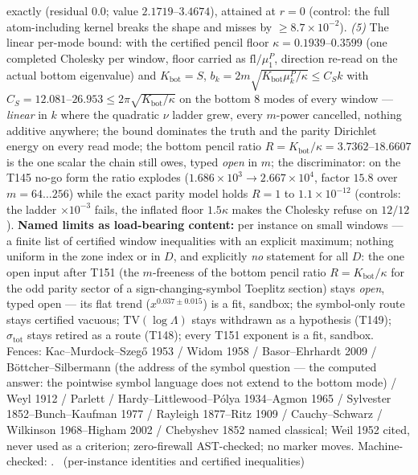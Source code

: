 exactly (residual $0.0$; value $2.1719$--$3.4674$), attained at $r=0$
(control: the full atom-including kernel breaks the shape and misses by
$\ge8.7\times10^{-2}$). \emph{(5)} The linear per-mode bound: with the
certified pencil floor $\kappa=0.1939$--$0.3599$ (one completed Cholesky
per window, floor carried as $\mathrm{fl}/\mu^P_1$, direction re-read on
the actual bottom eigenvalue) and $K_{\mathrm{bot}}=S$,
$b_k=2m\sqrt{K_{\mathrm{bot}}\mu^P_k/\kappa}\le C_Sk$ with
$C_S=12.081$--$26.953\le2\pi\sqrt{K_{\mathrm{bot}}/\kappa}$ on the bottom
$8$ modes of every window --- \emph{linear} in $k$ where the quadratic
$\nu$ ladder grew, every $m$-power cancelled, nothing additive anywhere;
the bound dominates the truth and the parity Dirichlet energy on every
read mode; the bottom pencil ratio
$R=K_{\mathrm{bot}}/\kappa=3.7362$--$18.6607$ is the one scalar the chain
still owes, typed \emph{open} in $m$; the discriminator: on the T145 no-go
form the ratio explodes ($1.686\times10^{3}\to2.667\times10^{4}$, factor
$15.8$ over $m=64\ldots256$) while the exact parity model holds $R=1$ to
$1.1\times10^{-12}$ (controls: the ladder $\times10^{-3}$ fails, the
inflated floor $1.5\kappa$ makes the Cholesky refuse on $12/12$).
\textbf{Named limits as load-bearing content:} per instance on small
windows --- a finite list of certified window inequalities with an explicit
maximum; nothing uniform in the zone index or in $D$, and explicitly
\emph{no} statement for all $D$: the one open input after T151 (the
$m$-freeness of the bottom pencil ratio $R=K_{\mathrm{bot}}/\kappa$ for
the odd parity sector of a sign-changing-symbol Toeplitz section) stays
\emph{open}, typed open --- its flat trend ($x^{0.037\pm0.015}$) is a fit,
sandbox; the symbol-only route stays certified vacuous;
$\mathrm{TV}(\log\Lambda)$ stays withdrawn as a hypothesis (T149);
$\sigma_{\mathrm{tot}}$ stays retired as a route (T148); every T151
exponent is a fit, sandbox. Fences: Kac--Murdock--Szeg\H{o} 1953 / Widom
1958 / Basor--Ehrhardt 2009 / B\"ottcher--Silbermann (the address of the
symbol question --- the computed answer: the pointwise symbol language
does not extend to the bottom mode) / Weyl 1912 / Parlett /
Hardy--Littlewood--P\'olya 1934--Agmon 1965 / Sylvester
1852--Bunch--Kaufman 1977 / Rayleigh 1877--Ritz 1909 / Cauchy--Schwarz /
Wilkinson 1968--Higham 2002 / Chebyshev 1852 named classical; Weil 1952
cited, never used as a criterion; zero-firewall AST-checked; no marker
moves.
Machine-checked: .
\mE\ (per-instance identities and certified inequalities)


